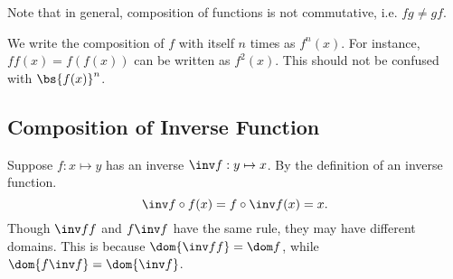 Note that in general, composition of functions is not commutative, i.e. $fg \neq gf$.

We write the composition of $f$ with itself $n$ times as $f^n(x)$. For instance, $ff(x) = f(f(x))$ can be written as $f^2(x)$. This should not be confused with $\bs{f(x)}^n$.

\subsection{Composition of Inverse Function}

Suppose $f : x \mapsto y$ has an inverse $\inv f : y \mapsto x$. By the definition of an inverse function. \[\inv f \circ f(x) = f \circ \inv f(x) = x.\] Though $\inv f f$ and $f \inv f$ have the same rule, they may have different domains. This is because $\dom {\inv f f} = \dom f$, while $\dom {f \inv f} = \dom {\inv f}$.